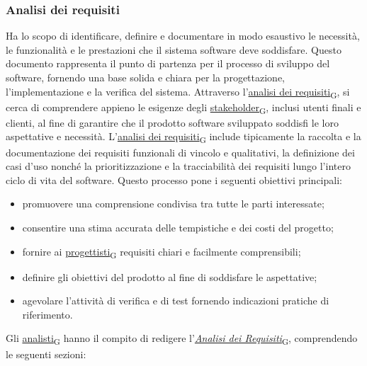 \subsubsection{Analisi dei requisiti}
Ha lo scopo di identificare, definire e documentare in modo esaustivo le necessità, le funzionalità e le prestazioni che il sistema software deve soddisfare. Questo documento rappresenta il punto di partenza per il processo di sviluppo del software, fornendo una base solida e chiara per la progettazione, l'implementazione e la verifica del sistema. Attraverso l'\href{https://7last.github.io/docs/rtb/documentazione-interna/glossario\#analisi-dei-requisiti}{analisi dei requisiti\textsubscript{G}}, si cerca di comprendere appieno le esigenze degli \href{https://7last.github.io/docs/rtb/documentazione-interna/glossario\#stakeholder}{stakeholder\textsubscript{G}}, inclusi utenti finali e clienti, al fine di garantire che il prodotto software sviluppato soddisfi le loro aspettative e necessità. L'\href{https://7last.github.io/docs/rtb/documentazione-interna/glossario\#analisi-dei-requisiti}{analisi dei requisiti\textsubscript{G}} include tipicamente la raccolta e la documentazione dei requisiti funzionali di vincolo e qualitativi, la definizione dei casi d'uso nonché la prioritizzazione e la tracciabilità dei requisiti lungo l'intero ciclo di vita del software.
\newpage
{}
Questo processo pone i seguenti obiettivi principali:
\begin{itemize}
	\item promuovere una comprensione condivisa tra tutte le parti interessate;
	\item consentire una stima accurata delle tempistiche e dei costi del progetto;
	\item fornire ai \href{https://7last.github.io/docs/rtb/documentazione-interna/glossario\#progettista}{progettisti\textsubscript{G}} requisiti chiari e facilmente comprensibili;
	\item definire gli obiettivi del prodotto al fine di soddisfare le aspettative;
	\item agevolare l'attività di verifica e di test fornendo indicazioni pratiche di riferimento.
\end{itemize}
Gli \href{https://7last.github.io/docs/rtb/documentazione-interna/glossario\#analista}{analisti\textsubscript{G}} hanno il compito di redigere l'\href{https://7last.github.io/docs/rtb/documentazione-interna/glossario\#analisi-dei-requisiti}{\textit{Analisi dei Requisiti}\textsubscript{G}}, comprendendo le seguenti sezioni:
